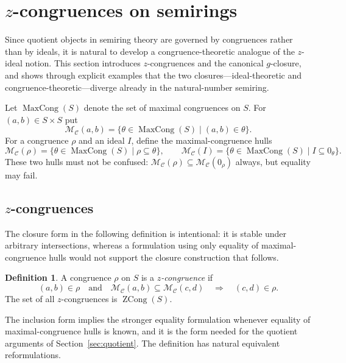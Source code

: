 \documentclass[11pt,leqno]{amsart}
\theoremstyle{plain}
\theoremstyle{definition}
\newtheorem{definition}{Definition}[section]
\theoremstyle{remark}
\numberwithin{equation}{section}
\DeclareMathOperator{\ZCong}{ZCong}
\DeclareMathOperator{\MaxC}{MaxCong}
\newcommand{\MC}{\mathcal M_{\mathcal C}}
\newcommand{\zero}[1]{0_{#1}}
\begin{document}
\section{\texorpdfstring{$z$}{z}-congruences on semirings}\label{sec:cong}

Since quotient objects in semiring theory are governed by congruences
rather than by ideals, it is natural to develop a congruence-theoretic
analogue of the $z$-ideal notion.
This section introduces $z$-congruences and the canonical
$g$-closure, and shows through explicit examples that the two
closures---ideal-theoretic and congruence-theoretic---diverge
already in the natural-number semiring.

Let $\MaxC(S)$ denote the set of maximal congruences on $S$.
For $(a,b)\in S\times S$ put
\[
\MC(a,b)=\{\theta\in\MaxC(S)\mid (a,b)\in\theta\}.
\]
For a congruence $\rho$ and an ideal $I$, define the
maximal-congruence hulls
\[
\MC(\rho)=\{\theta\in\MaxC(S)\mid \rho\subseteq\theta\},
\qquad
\MC(I)=\{\theta\in\MaxC(S)\mid I\subseteq\zero\theta\}.
\]
These two hulls must not be confused: $\MC(\rho)\subseteq\MC(\zero\rho)$
always, but equality may fail.

\subsection{\texorpdfstring{$z$}{z}-congruences}

The closure form in the following definition is intentional:
it is stable under arbitrary intersections,
whereas a formulation using only equality of maximal-congruence hulls
would not support the closure construction that follows.

\begin{definition}\label{def:zcong}
A congruence $\rho$ on $S$ is a \emph{$z$-congruence} if
\[
(a,b)\in\rho\quad\text{and}\quad\MC(a,b)\subseteq\MC(c,d)
\quad\Longrightarrow\quad(c,d)\in\rho.
\]
The set of all $z$-congruences is $\ZCong(S)$.
\end{definition}

The inclusion form implies the stronger equality formulation whenever
equality of maximal-congruence hulls is known,
and it is the form needed for the quotient arguments
of Section~\ref{sec:quotient}.
The definition has natural equivalent reformulations.
\end{document}
